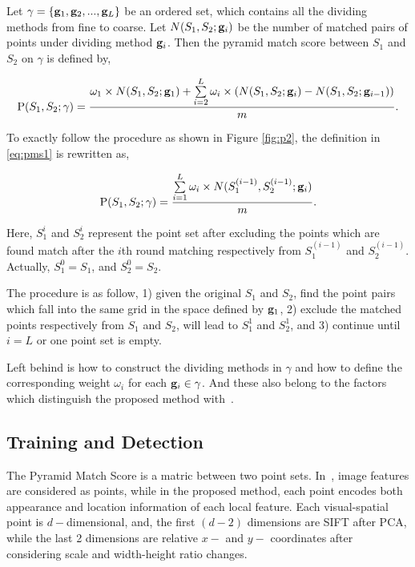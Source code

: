 Let $\gamma  = \{ {{\bf{g}}_1},{{\bf{g}}_2},...,{{\bf{g}}}_L\}$ be an ordered set, which contains all the dividing methods from fine to coarse. Let $N(S_1,S_2;{\bf{g}}_i)$ be the number of matched pairs of points under dividing method ${\bf{g}}_i$. Then the pyramid match score between $S_1$ and $S_2$ on $\gamma$ is defined by,

\begin{equation}
{\rm P}(S_1,S_2;\gamma)=\frac{{\omega}_1 \times N(S_1,S_2; {\bf{g}}_1) + \sum\limits^L_{i=2}{{\omega}_i\times( N(S_1,S_2;{\bf{g}}_i)-N(S_1,S_2;{\bf{g}}_{i-1}) ) }}{m}
.
\label{eq:pms1}
\end{equation}

To exactly follow the procedure as shown in Figure \ref{fig:p2}, the definition in \ref{eq:pms1} is rewritten as,

\begin{equation}
{\rm P}(S_1,S_2;\gamma)=\frac{ \sum\limits^L_{i=1}{{\omega}_i\times N(S_1^{(i-1)},S_2^{(i-1)};{\bf{g}}_i) }}{m}
.
\label{eq:pms2}
\end{equation}

Here, $S_1^i$ and $S_2^i$ represent the point set after excluding the points which are found match after the $i$th round matching respectively from $S_1^{(i-1)}$ and $S_2^{(i-1)}$. Actually, $S_1^0=S_1$, and $S_2^0=S_2$.

The procedure is  as follow, 1) given the original $S_1$ and $S_2$, find the point pairs which fall into the same grid in the space defined by ${\bf g}_1$, 2) exclude the matched points respectively from $S_1$ and $S_2$, will lead to $S_1^1$ and $S_2^1$, and 3) continue until $i=L$ or one point set is empty.

Left behind is how to construct the dividing methods in $\gamma$ and how to define the corresponding weight ${\omega}_i$ for each ${\bf{g}}_i \in \gamma$.
And these also belong to the factors which distinguish the proposed method with~\citep{pmk}.


\subsection{Training and Detection}

The Pyramid Match Score is a matric between two point sets. In~\citep{pmk}, image features are considered as points, while in the proposed method, each point encodes both appearance and location information of each local feature. Each visual-spatial point is $d-$dimensional, and, the first $(d-2)$ dimensions are SIFT after PCA, while the last 2 dimensions are relative $x-$ and $y-$ coordinates after considering scale and width-height ratio changes.

